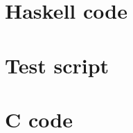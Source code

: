 \documentclass[4pt]{article}
\begin{document}
\maketitle


\section{Haskell code}



\newpage
\section{Test script}

\newpage
\section{C code}
\end{document}
